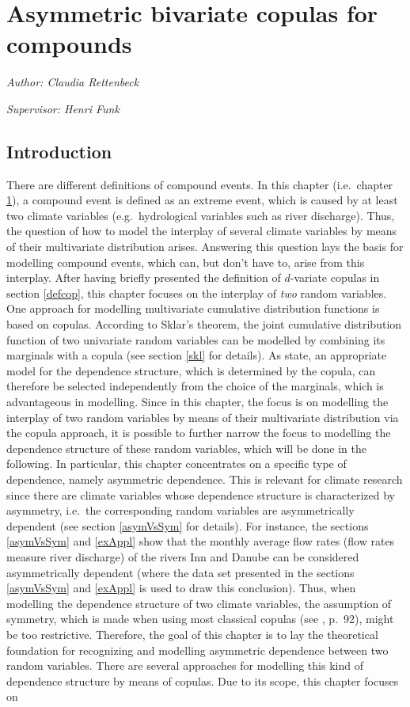 \documentclass[
]{krantz}
\begin{document}
\chapter{Asymmetric bivariate copulas for compounds}\label{ac}

\emph{Author: Claudia Rettenbeck}

\emph{Supervisor: Henri Funk}

\section{Introduction}\label{intro}

There are different definitions of compound events. In this chapter (i.e.~chapter \ref{ac}), a compound event is defined as an extreme event, which is caused by at least two climate variables (e.g.~hydrological variables such as river discharge). Thus, the question of how to model the interplay of several climate variables by means of their multivariate distribution arises. Answering this question lays the basis for modelling compound events, which can, but don't have to, arise from this interplay. After having briefly presented the definition of \(d\)-variate copulas in section \ref{defcop}, this chapter focuses on the interplay of \emph{two} random variables. One approach for modelling multivariate cumulative distribution functions is based on copulas. According to Sklar's theorem, the joint cumulative distribution function of two univariate random variables can be modelled by combining its marginals with a copula (see section \ref{skl} for details). As \citet{genest2007} state, an appropriate model for the dependence structure, which is determined by the copula, can therefore be selected independently from the choice of the marginals, which is advantageous in modelling. Since in this chapter, the focus is on modelling the interplay of two random variables by means of their multivariate distribution via the copula approach, it is possible to further narrow the focus to modelling the dependence structure of these random variables, which will be done in the following. In particular, this chapter concentrates on a specific type of dependence, namely asymmetric dependence. This is relevant for climate research since there are climate variables whose dependence structure is characterized by asymmetry, i.e.~the corresponding random variables are asymmetrically dependent (see section \ref{asymVsSym} for details). For instance, the sections \ref{asymVsSym} and \ref{exAppl} show that the monthly average flow rates (flow rates measure river discharge) of the rivers Inn and Danube can be considered asymmetrically dependent (where the data set presented in the sections \ref{asymVsSym} and \ref{exAppl} is used to draw this conclusion). Thus, when modelling the dependence structure of two climate variables, the assumption of symmetry, which is made when using most classical copulas (see \citet{genest2013}, p.~92), might be too restrictive. Therefore, the goal of this chapter is to lay the theoretical foundation for recognizing and modelling asymmetric dependence between two random variables. There are several approaches for modelling this kind of dependence structure by means of copulas. Due to its scope, this chapter focuses on 
\end{document}
